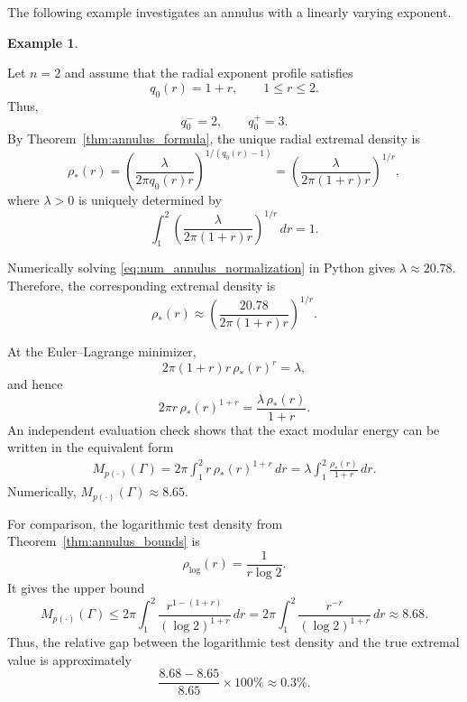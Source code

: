 \documentclass[12pt]{amsart}
\numberwithin{equation}{section}
\theoremstyle{plain}
\theoremstyle{definition}
\newtheorem{example}[equation]{Example}
\begin{document}
The following example investigates an annulus with a linearly varying exponent.
\begin{example}
\label{ex:comp_annulus}
\rm

Let $n=2$ and assume that the radial exponent profile satisfies
\begin{equation*}
q_0(r)=1+r, \qquad 1\le r\le2.
\end{equation*}
Thus,
\begin{equation*}
q_0^-=2, \qquad q_0^+=3.
\end{equation*}
By Theorem~\ref{thm:annulus_formula}, the unique radial extremal density is
\begin{equation*}
\rho_*(r) = \left( \frac{\lambda}{2\pi q_0(r)r} \right)^{1/(q_0(r)-1)} = \left( \frac{\lambda}{2\pi(1+r)r} \right)^{1/r},
\end{equation*}
where $\lambda>0$ is uniquely determined by
\begin{equation}
\label{eq:num_annulus_normalization}
\int_1^2 \left( \frac{\lambda} {2\pi(1+r)r} \right)^{1/r} \,dr =1.
\end{equation}

Numerically solving \eqref{eq:num_annulus_normalization} in Python gives $\lambda \approx 20.78.$ Therefore, the corresponding extremal density is
\begin{equation*}
\rho_*(r) \approx \left( \frac{20.78} {2\pi(1+r)r} \right)^{1/r}.
\end{equation*}

At the Euler--Lagrange minimizer,
\begin{equation*}
2\pi(1+r)r\,\rho_*(r)^{r} = \lambda,
\end{equation*}
and hence
\begin{equation*}
2\pi r\,\rho_*(r)^{1+r} = \frac{\lambda\,\rho_*(r)}{1+r}.
\end{equation*}
An independent evaluation check shows that the exact modular energy can be written in the equivalent form
\begin{align*}
M_{p(\cdot)}(\Gamma) = 2\pi\int_1^2 r\,\rho_*(r)^{1+r}\,dr = \lambda \int_1^2 \frac{\rho_*(r)}{1+r}\,dr.
\end{align*}
Numerically, $M_{p(\cdot)}(\Gamma)\approx 8.65.$

For comparison, the logarithmic test density from Theorem~\ref{thm:annulus_bounds} is
\begin{equation*}
\rho_{\log}(r) = \frac{1}{r\log 2}.
\end{equation*}
It gives the upper bound
\begin{equation*}
M_{p(\cdot)}(\Gamma) \le 2\pi \int_1^2 \frac{r^{1-(1+r)}}{(\log2)^{1+r}} \,dr = 2\pi \int_1^2 \frac{r^{-r}}{(\log2)^{1+r}} \,dr \approx 8.68.
\end{equation*}
Thus, the relative gap between the logarithmic test density and the true extremal value is approximately
\begin{equation*}
\frac{8.68-8.65}{8.65}\times100\% \approx 0.3\%.
\end{equation*}


\end{example}
\end{document}
